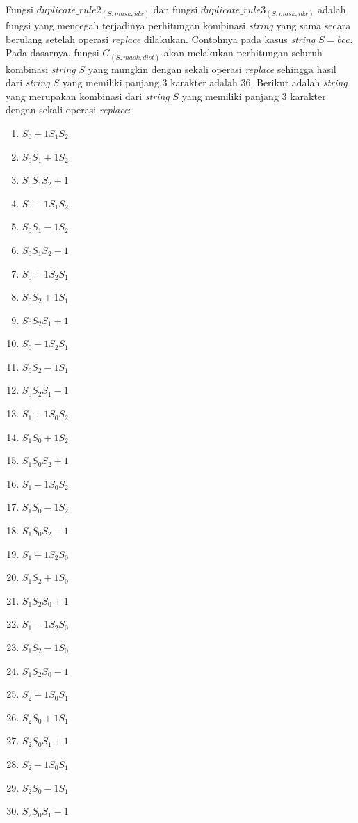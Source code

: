 Fungsi $ duplicate\_rule2_{(S, mask, idx)} $ dan fungsi $ duplicate\_rule3_{(S, mask, idx)} $ adalah fungsi yang mencegah terjadinya perhitungan kombinasi \textit{string} yang sama secara berulang setelah operasi \textit{replace} dilakukan. Contohnya pada kasus \textit{string} $ S=bcc $. Pada dasarnya, fungsi $ G_{(S, mask, dist)} $ akan melakukan perhitungan seluruh kombinasi \textit{string} $ S $ yang mungkin dengan sekali operasi \textit{replace} sehingga hasil dari \textit{string} $ S $ yang memiliki panjang $ 3 $ karakter adalah $ 36 $. Berikut adalah \textit{string} yang merupakan kombinasi dari \textit{string} $ S $ yang memiliki panjang 3 karakter dengan sekali operasi \textit{replace}:
\begin{enumerate}
	\item $ S_{0}+1S_{1}S_{2} $
	\item $ S_{0}S_{1}+1S_{2} $
	\item $ S_{0}S_{1}S_{2}+1 $
	\item $ S_{0}-1S_{1}S_{2} $
	\item $ S_{0}S_{1}-1S_{2} $
	\item $ S_{0}S_{1}S_{2}-1 $
	
	\item $ S_{0}+1S_{2}S_{1} $
	\item $ S_{0}S_{2}+1S_{1} $
	\item $ S_{0}S_{2}S_{1}+1 $
	\item $ S_{0}-1S_{2}S_{1} $
	\item $ S_{0}S_{2}-1S_{1} $
	\item $ S_{0}S_{2}S_{1}-1 $
	
	\item $ S_{1}+1S_{0}S_{2} $
	\item $ S_{1}S_{0}+1S_{2} $
	\item $ S_{1}S_{0}S_{2}+1 $
	\item $ S_{1}-1S_{0}S_{2} $
	\item $ S_{1}S_{0}-1S_{2} $
	\item $ S_{1}S_{0}S_{2}-1 $
	
	\item $ S_{1}+1S_{2}S_{0} $
	\item $ S_{1}S_{2}+1S_{0} $
	\item $ S_{1}S_{2}S_{0}+1 $
	\item $ S_{1}-1S_{2}S_{0} $
	\item $ S_{1}S_{2}-1S_{0} $
	\item $ S_{1}S_{2}S_{0}-1 $
	
	\item $ S_{2}+1S_{0}S_{1} $
	\item $ S_{2}S_{0}+1S_{1} $
	\item $ S_{2}S_{0}S_{1}+1 $
	\item $ S_{2}-1S_{0}S_{1} $
	\item $ S_{2}S_{0}-1S_{1} $
	\item $ S_{2}S_{0}S_{1}-1 $
	

\end{enumerate}
